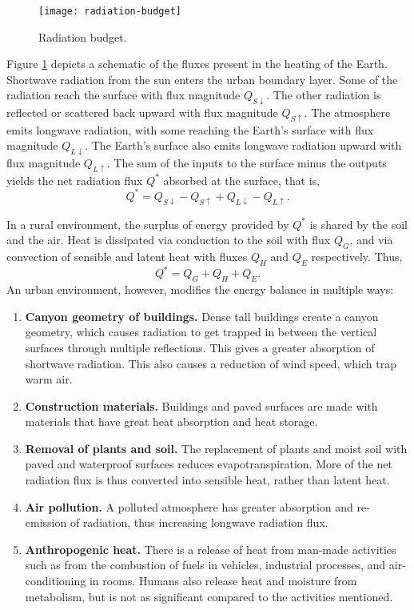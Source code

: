 	\begin{figure}	
		\centering
		\texttt{[image: radiation-budget]}
		\caption{Radiation budget.}
		\label{fig:radiation-budget}
	\end{figure}

	Figure \ref{fig:radiation-budget} depicts a schematic of the fluxes present in the heating of the Earth.
	Shortwave radiation from the sun enters the urban boundary layer.
	Some of the radiation reach the surface with flux magnitude $Q_{S\downarrow}$.
	The other radiation is reflected or scattered back upward with flux magnitude $Q_{S\uparrow}$.
	The atmosphere emits longwave radiation, with some
	reaching the Earth’s surface with flux magnitude $Q_{L\downarrow}$.
	The Earth’s surface also emits longwave radiation upward with flux magnitude $Q_{L\uparrow}$. 
	The sum of the inputs to the surface minus the outputs yields the net radiation flux $Q^*$ absorbed at the surface, that is,
	\begin{equation}
		Q^* = Q_{S\downarrow} - Q_{S\uparrow} + Q_{L\downarrow} - Q_{L\uparrow}.
	\end{equation}
		
	In a rural environment, the surplus of energy provided by $Q^*$ is shared by the soil and the air.
	Heat is dissipated via conduction to the soil with flux $Q_G$,
		and via convection of sensible and latent heat with fluxes $Q_H$ and $Q_E$ respectively. 
	Thus,
	\begin{equation}
		Q^* = Q_G + Q_H + Q_E.
	\end{equation}
	An urban environment, however, modifies the energy balance in multiple ways:
	\begin{enumerate}
		\item \textbf{Canyon geometry of buildings.}
		Dense tall buildings create a canyon geometry,
			which causes radiation to get trapped in between the vertical surfaces through multiple reflections.
		This gives a greater absorption of shortwave radiation.
		This also causes a reduction of wind speed, which trap warm air.
		
		\item \textbf{Construction materials.}
		Buildings and paved surfaces are made with materials that have great heat absorption and heat storage.
		
		\item \textbf{Removal of plants and soil.}
		The replacement of plants and moist soil with paved and waterproof surfaces reduces evapotranspiration.
		More of the net radiation flux is thus converted into sensible heat, rather than latent heat.
		
		\item \textbf{Air pollution.}
		A polluted atmosphere has greater absorption and re-emission of radiation, thus increasing longwave radiation flux.
		
		\item \textbf{Anthropogenic heat.}
		There is a release of heat from man-made activities such as from
			the combustion of fuels in vehicles,
			industrial processes, and
			air-conditioning in rooms.
		Humans also release heat and moisture from metabolism, but is not as significant compared to the activities mentioned.
	\end{enumerate}

